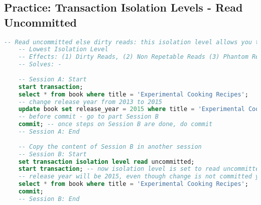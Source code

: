 \subsection{Practice: Transaction Isolation Levels - Read Uncommitted}
\begin{lstlisting}[language=SQL]
	-- Read uncommitted else dirty reads: this isolation level allows you to see changes that are not yet committed
	-- Lowest Isolation Level
	-- Effects: (1) Dirty Reads, (2) Non Repetable Reads (3) Phantom Reads
	-- Solves: -
	
	-- Session A: Start
	start transaction;
	select * from book where title = 'Experimental Cooking Recipes';
	-- change release year from 2013 to 2015
	update book set release_year = 2015 where title = 'Experimental Cooking Recipes';
	-- before commit - go to part Session B
	commit; -- once steps on Session B are done, do commit
	-- Session A: End
	
	-- Copy the content of Session B in another session
	-- Session B: Start
	set transaction isolation level read uncommitted;
	start transaction; -- now isolation level is set to read uncommitted
	-- release year will be 2015, even though change is not committed yet
	select * from book where title = 'Experimental Cooking Recipes';
	commit;
	-- Session B: End
\end{lstlisting}
